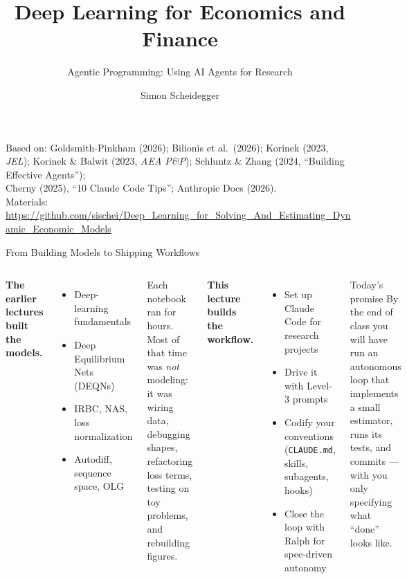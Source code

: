 \documentclass[aspectratio=169,10pt]{beamer}
\title[Deep Learning for Dynamic Economic Models]
{Deep Learning for Economics and Finance}
\subtitle{Agentic Programming: Using AI Agents for Research}
\author{Simon Scheidegger}
\institute[HEC Lausanne]{HEC, University of Lausanne}
\date{}
\newcommand{\emphc}[1]{\textcolor{harvardcrimson}{#1}}
\begin{document}

{
\begin{frame}
\titlepage
\vspace{-0.4cm}
\begin{center}
{\footnotesize Based on: Goldsmith-Pinkham (2026); Bilionis et al.\ (2026);
Korinek (2023, \emph{JEL}); Korinek \& Balwit (2023, \emph{AEA P\&P});
Schluntz \& Zhang (2024, ``Building Effective Agents'');\\
Cherny (2025), ``10 Claude Code Tips''; Anthropic Docs (2026).}\\[4pt]
{\footnotesize Materials: \url{https://github.com/sischei/Deep_Learning_for_Solving_And_Estimating_Dynamic_Economic_Models}}
\end{center}
\end{frame}
}

\begin{frame}{From Building Models to Shipping Workflows}
\small
\begin{columns}[T]
\textbf{The earlier lectures built the models.}
\begin{itemize}\itemsep0pt
    \item Deep-learning fundamentals
    \item Deep Equilibrium Nets (DEQNs)
    \item IRBC, NAS, loss normalization
    \item Autodiff, sequence space, OLG
\end{itemize}

\vspace{0.3em}
{\scriptsize Each notebook ran for hours. Most of that time was \emph{not}
modeling: it was wiring data, debugging shapes, refactoring loss terms,
testing on toy problems, and rebuilding figures.}

\textbf{This lecture builds the \emphc{workflow}.}
\begin{itemize}\itemsep0pt
    \item Set up Claude Code for research projects
    \item Drive it with Level-3 prompts
    \item Codify your conventions (\texttt{CLAUDE.md}, skills, subagents, hooks)
    \item Close the loop with \emphc{Ralph} for spec-driven autonomy
\end{itemize}

\vspace{0.3em}
\begin{alertblock}{Today's promise}
\scriptsize By the end of class you will have run an autonomous loop that
implements a small estimator, runs its tests, and commits --- with you only
specifying what ``done'' looks like.
\end{alertblock}
\end{columns}
\end{frame}
\end{document}
